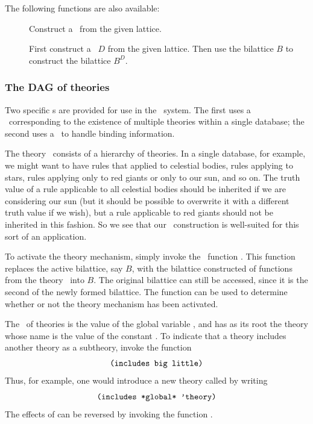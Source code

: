 The following functions are also available:
 \begin{description}
 \item [] Construct a \dg\ from the
given lattice.
 \item []  First
construct a \dg\ $D$ from the given lattice.  Then use the bilattice
$B$ to construct the bilattice $B^D$.
 \end{description}

\subsubsection{The DAG of theories}
\label{s.theory}

Two specific \dg s are provided for use in the \mvl\ system.  The first
uses a \dg\ corresponding to the existence of multiple theories within
a single database; the second uses a \dg\ to handle binding information.

The theory \dg\ consists of a hierarchy of theories.  In a single
database, for example, we might want to have rules that applied to
celestial bodies, rules applying to stars, rules applying only to red
giants or only to our sun, and so on.  The truth value of a rule
applicable to all celestial bodies should be inherited if we are
considering our sun (but it should be possible to overwrite it with
a different truth value if we wish), but a rule applicable to red
giants should not be inherited in this fashion.  So we see that our
\dg\ construction is well-suited for this sort of an application.

To activate the theory mechanism, simply invoke the \lisp\ function
.  This function replaces the active
bilattice, say $B$, with the bilattice constructed of functions from
the theory \dg\ into $B$.  The original bilattice can still be
accessed, since it is the second  of the newly formed
bilattice.  The function  can be used to
determine whether or not the theory mechanism has been activated.

The \dg\ of theories is the value of the global variable
, and has as its root the theory whose name is the
value of the constant .  To indicate that a theory
 includes another theory  as a subtheory,
invoke the function 
 \[\mbox{\tt (includes big little)}\]
 Thus, for example, one would introduce a new theory called
 by writing
 \[\mbox{\tt (includes *global* 'theory)}\]
 The effects of  can be reversed by invoking the
function .

